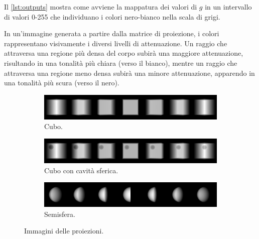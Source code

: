 \documentclass[12pt,a4paper]{report}
\begin{document}
Il \autoref{lst:outputs} mostra come avviene la mappatura dei valori di \(g\) in un intervallo di valori 0-255 che individuano i
colori nero-bianco nella scala di grigi.

In un'immagine generata a partire dalla matrice di proiezione, i colori rappresentano visivamente i diversi livelli di
attenuazione.
Un raggio che attraversa una regione più densa del corpo subirà una maggiore attenuazione, risultando in una tonalità più chiara
(verso il bianco), mentre un raggio che attraversa una regione meno densa subirà una minore attenuazione, apparendo in una
tonalità più scura (verso il nero).

\begin{figure}[H]
  \centering
  \begin{subfigure}{\textwidth}
    \centering
    \includegraphics[width=\textwidth]{Cube}
    \caption{\label{fig:projection_images_1} Cubo.}
  \end{subfigure}
  \begin{subfigure}{\textwidth}
    \centering
    \includegraphics[width=\textwidth]{CubeWithSphericalHole}
    \caption{\label{fig:projection_images_2} Cubo con cavità sferica.}
  \end{subfigure}
  \begin{subfigure}{\textwidth}
    \centering
    \includegraphics[width=\textwidth]{HalfSphere}
    \caption{\label{fig:projection_images_3} Semisfera.}
  \end{subfigure}
  \caption{\label{fig:projection_images} Immagini delle proiezioni.}
\end{figure}
\end{document}
